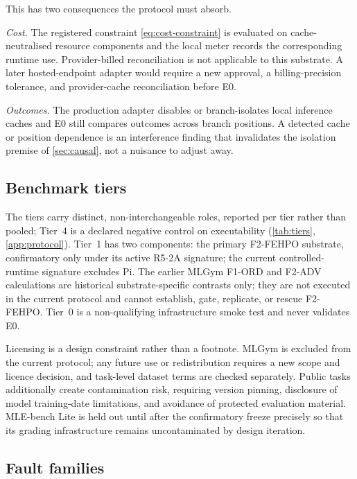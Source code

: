 This has two consequences the protocol must absorb.

\emph{Cost.}  The registered constraint \eqref{eq:cost-constraint} is evaluated
on cache-neutralised resource components and the local meter records the
corresponding runtime use.  Provider-billed reconciliation is not applicable to
this substrate.  A later hosted-endpoint adapter would require a new approval,
a billing-precision tolerance, and provider-cache reconciliation before E0.

\emph{Outcomes.}  The production adapter disables or branch-isolates local
inference caches and E0 still compares outcomes across branch positions.  A
detected cache or position dependence is an interference finding that invalidates
the isolation premise of \cref{sec:causal}, not a nuisance to adjust away.

\subsection{Benchmark tiers}

The tiers carry distinct, non-interchangeable roles, reported per tier rather
than pooled; Tier~4 is a declared negative control on executability
(\cref{tab:tiers}, \cref{app:protocol}).  Tier~1 has two components: the
primary F2-FEHPO substrate, confirmatory only under its active R5-2A signature;
the current controlled-runtime signature excludes Pi.  The earlier MLGym F1-ORD and F2-ADV calculations are historical
substrate-specific contrasts only; they are not executed in the current protocol
and cannot establish, gate, replicate, or rescue F2-FEHPO.  Tier~0 is a
non-qualifying infrastructure smoke test and never validates E0.

Licensing is a design constraint rather than a footnote.  MLGym is excluded from
the current protocol; any future use or redistribution requires a new scope and
licence decision, and task-level dataset terms are checked separately.  Public tasks additionally
create contamination risk, requiring version pinning, disclosure of model
training-date limitations, and avoidance of protected evaluation material.
MLE-bench Lite is held out until after the confirmatory freeze precisely so that
its grading infrastructure remains uncontaminated by design iteration.

\subsection{Fault families}


